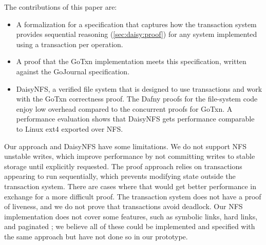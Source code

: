 The contributions of this paper are: 
\begin{itemize}
  \item A formalization for a specification that captures how the transaction
  system provides sequential reasoning (\cref{sec:daisy:proof}) for any system
  implemented using a transaction per operation.
  \item A proof that the GoTxn implementation meets this specification, written
  against the GoJournal specification.
  \item DaisyNFS, a verified file system that is designed to use transactions
  and work with the GoTxn correctness proof. The Dafny proofs for the
  file-system code enjoy low overhead compared to the concurrent proofs for GoTxn. A performance
  evaluation shows that DaisyNFS gets performance comparable to Linux ext4
  exported over NFS.
\end{itemize}

Our approach and DaisyNFS have some limitations. We do not support NFS unstable
writes, which improve performance by not committing writes to stable storage
until explicitly requested. The proof approach relies on transactions appearing
to run sequentially, which prevents modifying state
outside the transaction system.
There are cases where that would get better performance in exchange for a more
difficult proof. The transaction system does not have a proof of liveness, and
we do not prove that transactions avoid deadlock. Our NFS implementation does
not cover some features, such as symbolic links, hard links, and paginated
; we believe all of these could be implemented and specified with
the same approach but have not done so in our prototype.

